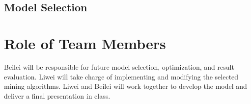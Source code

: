 \documentclass{spie}
\begin{document}
\subsection{Model Selection}



\section{Role of Team Members}

Beilei will be responsible for future model selection, optimization, and result evaluation. Liwei will take charge of implementing and modifying the selected mining algorithms. Liwei and Beilei will work together to develop the model and deliver a final presentation in class.
\end{document}
